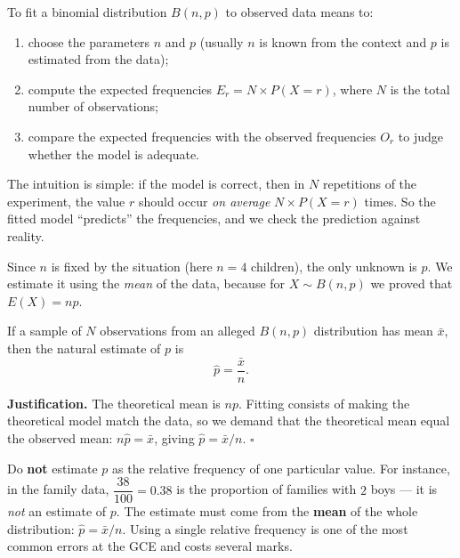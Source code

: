 \documentclass[11pt]{article}
\newcommand{\cle}[1]{{\popxbold\color{popdark}#1}}
\newcounter{popsec}
\newcounter{popsub}
\newcommand{\courssub}[1]{%
  \stepcounter{popsub}%
  \par\vspace{9pt}\noindent{\popxbold\fontsize{11.5}{13}\selectfont\color{popink}{\color{poporange}\thepopsec.\thepopsub}\hspace{6pt}#1}\par\nopagebreak\vspace{4pt}
}
\begin{document}
\begin{definition}
To \cle{fit} a binomial distribution $B(n,p)$ to observed data means to:
\begin{enumerate}
\item choose the parameters $n$ and $p$ (usually $n$ is known from the context and $p$ is estimated from the data);
\item compute the \cle{expected frequencies} $E_r = N\times P(X=r)$, where $N$ is the total number of observations;
\item compare the expected frequencies with the observed frequencies $O_r$ to judge whether the model is adequate.
\end{enumerate}
\end{definition}

The intuition is simple: if the model is correct, then in $N$ repetitions of the experiment, the value $r$ should occur \emph{on average} $N\times P(X=r)$ times. So the fitted model ``predicts'' the frequencies, and we check the prediction against reality.

\courssub{Estimating $p$ from the Data}

Since $n$ is fixed by the situation (here $n=4$ children), the only unknown is $p$. We estimate it using the \emph{mean} of the data, because for $X\sim B(n,p)$ we proved that $E(X)=np$.

\begin{propriete}[Estimating $p$]
If a sample of $N$ observations from an alleged $B(n,p)$ distribution has mean $\bar{x}$, then the natural estimate of $p$ is
\[ \hat{p}=\frac{\bar{x}}{n}. \]
\end{propriete}

\textbf{Justification.} The theoretical mean is $np$. Fitting consists of making the theoretical model match the data, so we demand that the theoretical mean equal the observed mean: $n\hat{p}=\bar{x}$, giving $\hat{p}=\bar{x}/n$. \hfill$\square$

\begin{attention}
Do \textbf{not} estimate $p$ as the relative frequency of one particular value. For instance, in the family data, $\dfrac{38}{100}=0.38$ is the proportion of families with $2$ boys --- it is \emph{not} an estimate of $p$. The estimate must come from the \textbf{mean} of the whole distribution: $\hat{p}=\bar{x}/n$. Using a single relative frequency is one of the most common errors at the GCE and costs several marks.
\end{attention}
\end{document}
